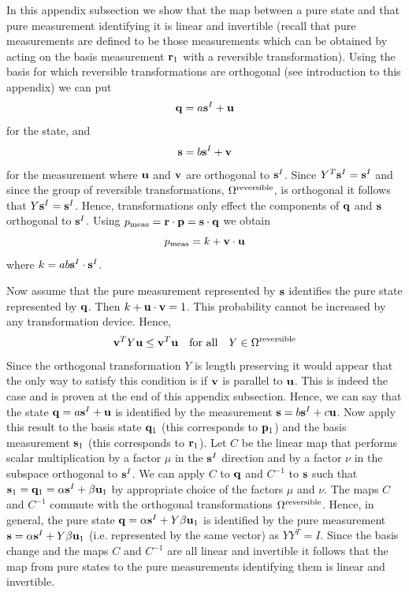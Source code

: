 \documentclass[10pt,twocolumn]{article}
\begin{document}
In this appendix subsection we show that the map between a pure state
and that pure measurement identifying it is linear and invertible
(recall that pure measurements are defined to be those measurements
which can be obtained by acting on the basis measurement ${\bf r}_1$
with a reversible transformation).
Using the basis for which reversible transformations are orthogonal (see
introduction to this appendix) we can put
\begin{equation}
{\bf q}= a {\bf s}^I + {\bf u}
\end{equation}
for the state, and
\begin{equation}
{\bf s}= b {\bf s}^I + {\bf v}
\end{equation}
for the measurement
where ${\bf u}$ and ${\bf v}$ are orthogonal to ${\bf s}^I$.  Since
$Y^T {\bf s}^I={\bf s}^I$ and since the group of reversible
transformations, $\Omega^{\rm reversible}$, is orthogonal it follows
that $Y {\bf s}^I={\bf s}^I$.   Hence, transformations only effect the
components of ${\bf q}$ and ${\bf s}$ orthogonal to ${\bf s}^I$.
Using $p_{\rm meas}={\bf r}\cdot {\bf p}={\bf s}\cdot{\bf q}$ we obtain
\begin{equation}
p_{\rm meas}=k + {\bf v}\cdot{\bf u}
\end{equation}
where $k=ab{\bf s}^I\cdot{\bf s}^I$.

Now assume that the
pure measurement represented by ${\bf s}$ identifies the pure state
represented by ${\bf q}$. Then $k+{\bf u}\cdot {\bf v}=1$.  This
probability cannot be increased by any transformation device. Hence,
\begin{equation}\label{vYu}
{\bf v}^T Y {\bf u} \leq {\bf v}^T {\bf u} ~~~{\rm for~all}~~~
Y\in\Omega^{\rm reversible}
\end{equation}
Since the orthogonal transformation $Y$ is length preserving it would
appear that the only way to satisfy this condition is
if ${\bf v}$ is parallel to ${\bf u}$.  This is indeed the case and is
proven at the end of this appendix subsection.
Hence, we can say that the state ${\bf q}= a {\bf s}^I + {\bf
u}$ is identified by the measurement ${\bf s}= b {\bf s}^I + c{\bf u}$.
Now apply this result to the basis state ${\bf q}_1$ (this corresponds
to ${\bf p}_{1}$) and the basis measurement ${\bf s}_1$ (this
corresponds to ${\bf r}_{1}$).  Let $C$ be the linear map that performs
scalar multiplication by a factor $\mu$ in the ${\bf s}^I$ direction and
by a factor $\nu$ in the subspace orthogonal to ${\bf s}^I$.  We can
apply $C$ to ${\bf q}$ and $C^{-1}$ to ${\bf s}$ such that
${\bf s}_1={\bf q}_1=\alpha{\bf s}^I + \beta{\bf u}_1$ by appropriate choice of
the factors $\mu$ and $\nu$.  The maps $C$ and $C^{-1}$ commute with the
orthogonal transformations $\Omega^{\rm reversible}$. Hence, in general,
the pure state ${\bf q}=\alpha{\bf s}^I + Y\beta{\bf u}_1$ is identified
by the pure measurement ${\bf s}=\alpha{\bf s}^I + Y\beta{\bf u}_1$
(i.e. represented by the same vector) as $YY^T=I$.
Since the basis change and the
maps $C$ and $C^{-1}$ are all linear and invertible it follows that the map from
pure states to the pure measurements identifying them is linear and
invertible.
\end{document}
